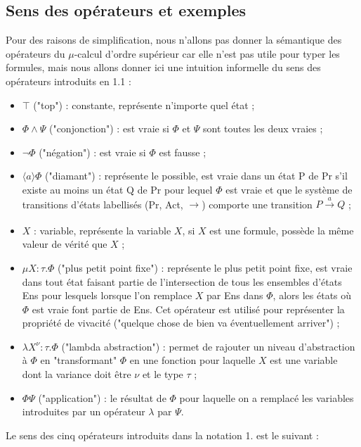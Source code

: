 \documentclass[11pt,a4paper]{article}
\theoremstyle{plain}
\theoremstyle{remark}
\theoremstyle{definition}
\begin{document}
\subsection{Sens des opérateurs et exemples}

Pour des raisons de simplification, nous n'allons pas donner la sémantique des opérateurs du $\mu$-calcul d'ordre supérieur car elle n'est pas utile pour typer les formules, mais nous allons donner ici une intuition informelle du sens des opérateurs introduits en 1.1 :

\begin{itemize}
  \item $\top$ ("top") : constante, représente n'importe quel état ;
  \item $\Phi \wedge \Psi$ ("conjonction") : est vraie si $\Phi$ et $\Psi$ sont toutes les deux vraies ;
  \item $\neg\Phi$ ("négation") : est vraie si $\Phi$ est fausse ;
  \item $\langle a \rangle \Phi$ ("diamant") : représente le possible, est vraie dans un état P de Pr s'il existe au moins un état Q de Pr pour lequel $\Phi$ est vraie et que le système de transitions d'états labellisés (Pr, Act, $\rightarrow$) comporte une transition $P\xrightarrow[]{a} Q$ ;
  \item $X$ : variable, représente la variable $X$, si $X$ est une formule, possède la même valeur de vérité que $X$ ;
  \item $\mu X : \tau . \Phi$ ("plus petit point fixe") : représente le plus petit point fixe, est vraie dans tout état faisant partie de l'intersection de tous les ensembles d'états Ens pour lesquels lorsque l'on remplace $X$ par Ens dans $\Phi$, alors les états où $\Phi$ est vraie font partie de Ens. Cet opérateur est utilisé pour représenter la propriété de vivacité ("quelque chose de bien va éventuellement arriver") ; 
  \item $\lambda X^{\nu} : \tau . \Phi$ ("lambda abstraction") : permet de rajouter un niveau d'abstraction à $\Phi$ en "transformant" $\Phi$ en une fonction pour laquelle $X$ est une variable dont la variance doit être $\nu$ et le type $\tau$ ;
  \item $\Phi \Psi$ ("application") : le résultat de $\Phi$ pour laquelle on a remplacé les variables introduites par un opérateur $\lambda$ par $\Psi$.  
\end{itemize} 

Le sens des cinq opérateurs introduits dans la notation 1. est le suivant :  
\end{document}
